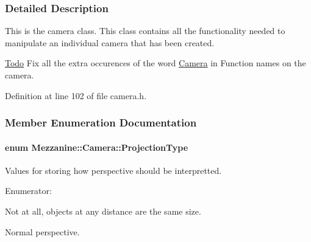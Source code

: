 \subsubsection{Detailed Description}
This is the camera class. This class contains all the functionality needed to manipulate an individual camera that has been created. \begin{Desc}
\item[\hyperlink{todo__todo000002}{Todo}]Fix all the extra occurences of the word \hyperlink{classMezzanine_1_1Camera}{Camera} in Function names on the camera. \end{Desc}


Definition at line 102 of file camera.h.



\subsubsection{Member Enumeration Documentation}
\hypertarget{classMezzanine_1_1Camera_a643bf90630796bca5353967664d5f6e3}{
\paragraph[{ProjectionType}]{\setlength{\rightskip}{0pt plus 5cm}enum {\bf Mezzanine::Camera::ProjectionType}}\hfill}
\label{classMezzanine_1_1Camera_a643bf90630796bca5353967664d5f6e3}


Values for storing how perspective should be interpretted. 

\begin{Desc}
\item[Enumerator: ]\par
\begin{description}
\item[{\em 
\hypertarget{classMezzanine_1_1Camera_a643bf90630796bca5353967664d5f6e3a5bf29bb9ff44080ae6cbfa3e2aeb467c}{
Orthographic}
\label{classMezzanine_1_1Camera_a643bf90630796bca5353967664d5f6e3a5bf29bb9ff44080ae6cbfa3e2aeb467c}
}]Not at all, objects at any distance are the same size. \item[{\em 
\hypertarget{classMezzanine_1_1Camera_a643bf90630796bca5353967664d5f6e3a616794ef1e113f63b1b9bf6896c61eba}{
Perspective}
\label{classMezzanine_1_1Camera_a643bf90630796bca5353967664d5f6e3a616794ef1e113f63b1b9bf6896c61eba}
}]Normal perspective. \end{description}
\end{Desc}



